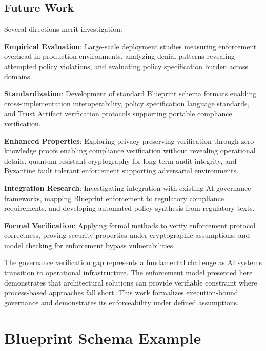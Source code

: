 \documentclass[11pt,letterpaper]{article}
\begin{document}
\subsection{Future Work}

Several directions merit investigation:

\textbf{Empirical Evaluation}: Large-scale deployment studies measuring enforcement overhead in production environments, analyzing denial patterns revealing attempted policy violations, and evaluating policy specification burden across domains.

\textbf{Standardization}: Development of standard Blueprint schema formats enabling cross-implementation interoperability, policy specification language standards, and Trust Artifact verification protocols supporting portable compliance verification.

\textbf{Enhanced Properties}: Exploring privacy-preserving verification through zero-knowledge proofs enabling compliance verification without revealing operational details, quantum-resistant cryptography for long-term audit integrity, and Byzantine fault tolerant enforcement supporting adversarial environments.

\textbf{Integration Research}: Investigating integration with existing AI governance frameworks, mapping Blueprint enforcement to regulatory compliance requirements, and developing automated policy synthesis from regulatory texts.

\textbf{Formal Verification}: Applying formal methods to verify enforcement protocol correctness, proving security properties under cryptographic assumptions, and model checking for enforcement bypass vulnerabilities.

The governance verification gap represents a fundamental challenge as AI systems transition to operational infrastructure. The enforcement model presented here demonstrates that architectural solutions can provide verifiable constraint where process-based approaches fall short. This work formalizes execution-bound governance and demonstrates its enforceability under defined assumptions.




\appendix

\section{Blueprint Schema Example}
\end{document}
